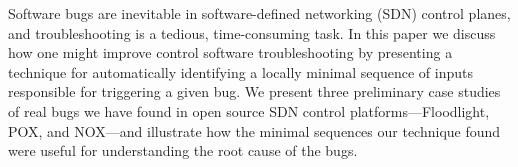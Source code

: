 Software bugs are inevitable in software-defined networking (SDN) control planes,
and troubleshooting
is a tedious, time-consuming task.
In this paper we discuss how one might improve
control software troubleshooting by presenting a technique
for automatically identifying
a locally minimal sequence of inputs responsible for triggering a given bug.
We present three preliminary case studies of real bugs we have found in open source SDN control
platforms---Floodlight, POX, and NOX---and
illustrate how the minimal sequences our technique found were useful for
understanding the root cause of the bugs.

